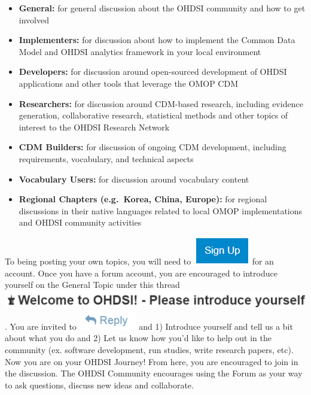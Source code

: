 \documentclass[11pt]{book}
\providecommand{\tightlist}{%
  \setlength{\itemsep}{0pt}\setlength{\parskip}{0pt}}
\theoremstyle{definition}
\theoremstyle{definition}
\theoremstyle{definition}
\theoremstyle{remark}
\begin{document}
\begin{itemize}
\tightlist
\item
  \textbf{General:} for general discussion about the OHDSI community and how to get involved
\item
  \textbf{Implementers:} for discussion about how to implement the Common Data Model and OHDSI analytics framework in your local environment
\item
  \textbf{Developers:} for discussion around open-sourced development of OHDSI applications and other tools that leverage the OMOP CDM
\item
  \textbf{Researchers:} for discussion around CDM-based research, including evidence generation, collaborative research, statistical methods and other topics of interest to the OHDSI Research Network
\item
  \textbf{CDM Builders:} for discussion of ongoing CDM development, including requirements, vocabulary, and technical aspects
\item
  \textbf{Vocabulary Users:} for discussion around vocabulary content
\item
  \textbf{Regional Chapters (e.g.~Korea, China, Europe):} for regional discussions in their native languages related to local OMOP implementations and OHDSI community activities
\end{itemize}

To being posting your own topics, you will need to \includegraphics{images/WhereToBegin/ForumSignUp.png} for an account. Once you have a forum account, you are encouraged to introduce yourself on the General Topic under this thread \includegraphics{images/WhereToBegin/Introduce.png}. You are invited to \includegraphics{images/WhereToBegin/Reply.png} and 1) Introduce yourself and tell us a bit about what you do and 2) Let us know how you'd like to help out in the community (ex. software development, run studies, write research papers, etc). Now you are on your OHDSI Journey! From here, you are encouraged to join in the discussion. The OHDSI Community encourages using the Forum as your way to ask questions, discuss new ideas and collaborate. 
\end{document}
